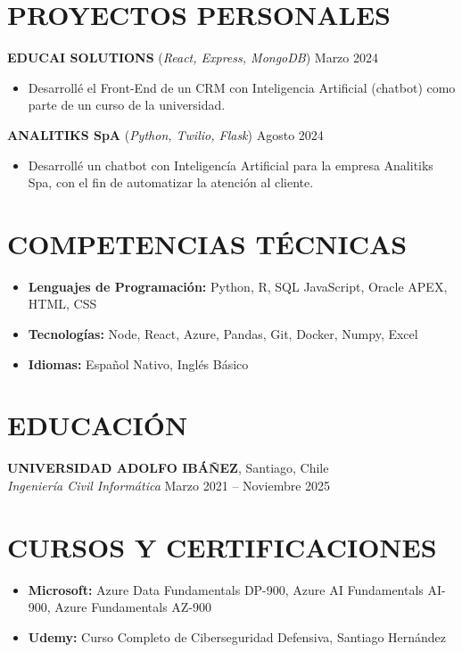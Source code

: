 \documentclass[a4paper,10pt]{article}
\begin{document}
\section*{PROYECTOS PERSONALES}
\textbf{EDUCAI SOLUTIONS} (\textit{React, Express, MongoDB}) \hfill Marzo 2024
\begin{itemize}[noitemsep]
    \item Desarrollé el Front-End de un CRM con Inteligencia Artificial (chatbot) como parte de un curso de la universidad.
\end{itemize}
\textbf{ANALITIKS SpA} (\textit{Python, Twilio, Flask}) \hfill Agosto 2024
\begin{itemize}[noitemsep]
    \item Desarrollé un chatbot con Inteligencía Artificial para la empresa Analitiks Spa, con el fin de automatizar la atención al cliente.
\end{itemize}

\section*{COMPETENCIAS TÉCNICAS}
\begin{itemize}[noitemsep]
    \item \textbf{Lenguajes de Programación:} Python, R, SQL JavaScript, Oracle APEX, HTML, CSS
    \item \textbf{Tecnologías:} Node, React, Azure, Pandas, Git, Docker, Numpy, Excel
    \item \textbf{Idiomas:} Español Nativo, Inglés Básico
\end{itemize}

\section*{EDUCACIÓN}
\textbf{UNIVERSIDAD ADOLFO IBÁÑEZ}, Santiago, Chile \\
\textit{Ingeniería Civil Informática} \hfill Marzo 2021 – Noviembre 2025

\section*{CURSOS Y CERTIFICACIONES}
\begin{itemize}[noitemsep]
    \item \textbf{Microsoft:} Azure Data Fundamentals DP-900, Azure AI Fundamentals AI-900, Azure Fundamentals AZ-900
    \item \textbf{Udemy:} Curso Completo de Ciberseguridad Defensiva, Santiago Hernández
\end{itemize}
\end{document}
